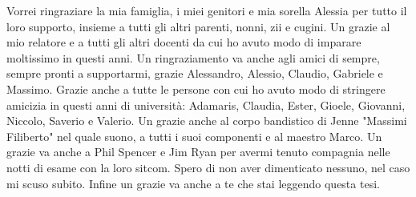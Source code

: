 \documentclass[binding=0.6cm]{sapthesis}
\begin{document}
\begin{acknowledgments}
Vorrei ringraziare la mia famiglia, i miei genitori e mia sorella Alessia per tutto il loro supporto, insieme a tutti gli altri parenti, nonni, zii e cugini. Un grazie al mio relatore e a tutti gli altri docenti da cui ho avuto modo di imparare moltissimo in questi anni. Un ringraziamento va anche agli amici di sempre, sempre pronti a supportarmi, grazie Alessandro, Alessio, Claudio, Gabriele e Massimo. Grazie anche a tutte le persone con cui ho avuto modo di stringere amicizia in questi anni di università: Adamaris, Claudia, Ester, Gioele, Giovanni, Niccolo, Saverio e Valerio. Un grazie anche al corpo bandistico di Jenne "Massimi Filiberto" nel quale suono, a tutti i suoi componenti e al maestro Marco.  Un grazie va anche a Phil Spencer e Jim Ryan per avermi tenuto compagnia nelle notti di esame con la loro sitcom. Spero di non aver dimenticato nessuno, nel caso mi scuso subito. Infine un grazie va anche a te che stai leggendo questa tesi.
\end{acknowledgments}
\end{document}
